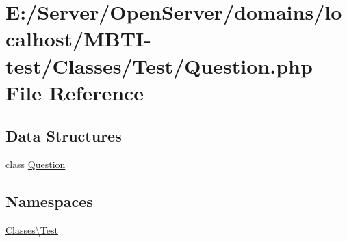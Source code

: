 \hypertarget{_question_8php}{}\section{E\+:/\+Server/\+Open\+Server/domains/localhost/\+M\+B\+T\+I-\/test/\+Classes/\+Test/\+Question.php File Reference}
\label{_question_8php}
\subsection*{Data Structures}
\begin{DoxyCompactItemize}
\item 
class \hyperlink{class_classes_1_1_test_1_1_question}{Question}
\end{DoxyCompactItemize}
\subsection*{Namespaces}
\begin{DoxyCompactItemize}
\item 
 \hyperlink{namespace_classes_1_1_test}{Classes\textbackslash{}\+Test}
\end{DoxyCompactItemize}
